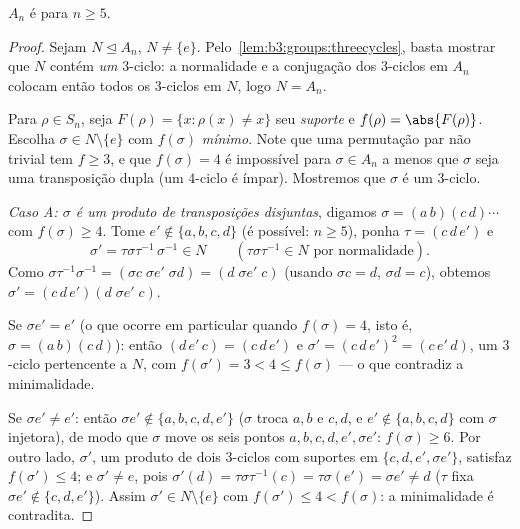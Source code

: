 \begin{theorem}\label{thm:b3:groups:ansimple}
$A_n$ é  para $n \geq 5$.
\end{theorem}

\begin{proof}
Sejam $N \trianglelefteq A_n$, $N \neq \{e\}$. Pelo~\cref{lem:b3:groups:threecycles}, basta mostrar que $N$
contém \emph{um} $3$-ciclo: a normalidade e a conjugação dos
$3$-ciclos em $A_n$ colocam então todos os $3$-ciclos em
$N$, logo $N = A_n$.

Para $\rho \in S_n$, seja $F(\rho) = \{x : \rho(x) \neq x\}$ seu \emph{suporte} e $f(\rho) = \abs{F(\rho)}$. Escolha $\sigma \in N
\setminus \{e\}$ com
$f(\sigma)$ \emph{mínimo}. Note que uma permutação par não trivial tem $f \geq 3$,
e que $f(\sigma) =
4$ é impossível para $\sigma \in A_n$ a menos que $\sigma$ seja uma
transposição dupla (um $4$-ciclo é ímpar). Mostremos que
$\sigma$ é um $3$-ciclo.

\emph{Caso A: $\sigma$ é um produto de transposições disjuntas},
digamos $\sigma = (a\,b)(c\,d)\cdots$ com $f(\sigma) \geq 4$. Tome $e'
\notin \{a, b, c, d\}$ (é possível: $n \geq 5$), ponha $\tau =
(c\,d\,e')$ e
\[
\sigma' = \tau\sigma\tau^{-1}\,\sigma^{-1} \in N
\qquad (\tau\sigma\tau^{-1} \in N \text{ por normalidade}).
\]
Como $\sigma\tau^{-1}\sigma^{-1} = (\sigma c\;\sigma e'\;\sigma
d) = (d\;\sigma e'\;c)$ (usando $\sigma c = d$, $\sigma d = c$), obtemos $\sigma' = (c\,d\,e')(d\;\sigma e'\;c)$.

Se $\sigma e' = e'$ (o que ocorre em particular quando $f(\sigma) =
4$, isto é, $\sigma = (a\,b)(c\,d)$):
então $(d\,e'\,c) =
(c\,d\,e')$ e $\sigma' = (c\,d\,e')^2 = (c\,e'\,d)$, um $3$-ciclo pertencente a $N$, com $f(\sigma') = 3 < 4 \leq f(\sigma)$
--- o que contradiz a minimalidade.

Se $\sigma e' \neq e'$: então $\sigma e' \notin \{a, b, c, d,
e'\}$ ($\sigma$ troca $a,b$ e $c,d$, e
$e' \notin \{a,b,c,d\}$ com $\sigma$ injetora), de modo que $\sigma$ move os seis
pontos $a, b,
c, d, e', \sigma e'$: $f(\sigma) \geq 6$. Por outro lado, $\sigma'$, um produto de dois
$3$-ciclos com suportes em $\{c, d,
e', \sigma e'\}$, satisfaz $f(\sigma') \leq 4$; e $\sigma' \neq
e$, pois
$\sigma'(d) = \tau\sigma\tau^{-1}(c) = \tau\sigma(e') =
\sigma e' \neq d$ ($\tau$ fixa $\sigma e' \notin \{c,d,e'\}$). Assim $\sigma' \in N \setminus\{e\}$ com $f(\sigma') \leq 4 <
f(\sigma)$: a minimalidade é
contradita.


\end{proof}
